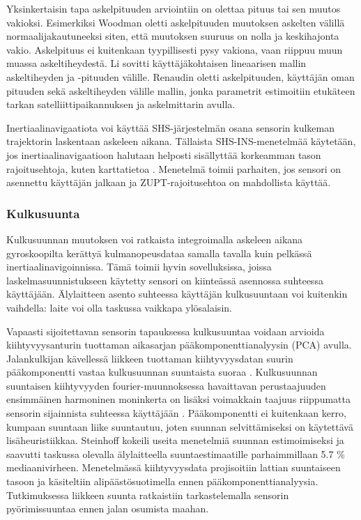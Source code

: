 Yksinkertaisin tapa askelpituuden arviointiin on olettaa pituus tai sen muutos
vakioksi. Esimerkiksi Woodman \cite{woodman2008} oletti askelpituuden muutoksen
askelten välillä normaalijakautuneeksi siten, että muutoksen suuruus on nolla
ja keskihajonta vakio. Askelpituus ei kuitenkaan tyypillisesti pysy vakiona,
vaan riippuu muun muassa askeltiheydestä. Li \cite{li2012} sovitti
käyttäjäkohtaisen lineaarisen mallin askeltiheyden ja -pituuden välille.
Renaudin \cite{renaudin2013} oletti askelpituuden, käyttäjän oman pituuden sekä
askeltiheyden välille mallin, jonka parametrit estimoitiin etukäteen tarkan
satelliittipaikannuksen ja askelmittarin avulla.

Inertiaalinavigaatiota voi käyttää SHS-järjestelmän osana sensorin kulkeman
trajektorin laskentaan askeleen aikana. Tällaista SHS-INS-menetelmää käytetään,
jos inertiaalinavigaatioon halutaan helposti sisällyttää korkeamman tason
rajoitusehtoja, kuten karttatietoa \cite{woodman2008}. Menetelmä toimii
parhaiten, jos sensori on asennettu käyttäjän jalkaan ja ZUPT-rajoitusehtoa on
mahdollista käyttää.

\subsubsection{Kulkusuunta}

Kulkusuunnan muutoksen voi ratkaista integroimalla askeleen aikana
gyroskoopilta kerättyä kulmanopeusdataa samalla tavalla kuin pelkässä
inertiaalinavigoinnissa. Tämä toimii hyvin sovelluksissa, joissa
laskelmasuunnistukseen käytetty sensori on kiinteässä asennossa suhteessa
käyttäjään. Älylaitteen asento suhteessa käyttäjän kulkusuuntaan voi kuitenkin
vaihdella: laite voi olla taskussa vaikkapa ylösalaisin.

Vapaasti sijoitettavan sensorin tapauksessa kulkusuuntaa voidaan arvioida
kiihtyvyysanturin tuottaman aikasarjan pääkomponenttianalyysin (PCA) avulla.
Jalankulkijan kävellessä liikkeen tuottaman kiihtyvyysdatan suurin
pääkomponentti vastaa kulkusuunnan suuntaista suoraa \cite{steinhoff2010}.
Kulkusuunnan suuntaisen kiihtyvyyden fourier-muunnoksessa havaittavan
perustaajuuden ensimmäinen harmoninen moninkerta on lisäksi voimakkain taajuus
riippumatta sensorin sijainnista suhteessa käyttäjään \cite{rai2012}.
Pääkomponentti ei kuitenkaan kerro, kumpaan suuntaan liike suuntautuu, joten
suunnan selvittämiseksi on käytettävä lisäheuristiikkaa. Steinhoff
\cite{steinhoff2010} kokeili useita menetelmiä suunnan estimoimiseksi ja
saavutti taskussa olevalla älylaitteella suuntaestimaatille parhaimmillaan 5.7
\% mediaanivirheen. Menetelmässä kiihtyvyysdata projisoitiin lattian
suuntaiseen tasoon ja käsiteltiin alipäästösuotimella ennen
pääkomponenttianalyysia. Tutkimuksessa liikkeen suunta ratkaistiin
tarkastelemalla sensorin pyörimissuuntaa ennen jalan osumista maahan.

